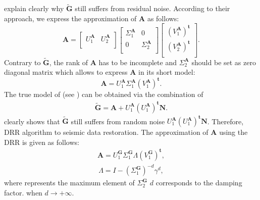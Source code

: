 \citet{huang2016damped} explain clearly why $\mathbf{\tilde{G}}$ still suffers from residual noise. According to their approach, we express the approximation of {$\mathbf{A}$} as follows:
\begin{equation}
\mathbf{A}=\begin{bmatrix}
U^\mathbf{A}_1 & U^\mathbf{A}_2\\
\end{bmatrix}
\begin{bmatrix}
\Sigma^\mathbf{A}_1 & 0\\
0 & \Sigma^\mathbf{A}_2\\
\end{bmatrix}
\begin{bmatrix}
(V^\mathbf{A}_1)^{\mathbf{t}}\\
(V^\mathbf{A}_2)^{\mathbf{t}}\\
\end{bmatrix}.
\end{equation}
Contrary to {$\mathbf{\tilde{G}}$}, the rank of $\mathbf{A}$ has to be incomplete and {$\Sigma^\mathbf{A}_2$} should be set as zero diagonal matrix\new{,} which allows to express $ \mathbf{A} $ in its short model:
\begin{equation}
\mathbf{A}=U^{\mathbf{A}}_1{\Sigma^{\mathbf{A}}_1}(V^{\mathbf{A}}_1)^{\mathbf{t}}.
\end{equation}
The true model of   (see ) can be obtained via the combination of    
\begin{align}
\mathbf{\tilde{G}}= \mathbf{A}+ U^{\mathbf{A}}_1(U^{\mathbf{A}}_1)^{\mathbf{t}}\mathbf{N}.
\end{align}
 clearly shows that {$\mathbf{\tilde{G}}$} still suffers from random noise ${U^\mathbf{A}_1(U^\mathbf{A}_1)^{\mathbf{t}}\mathbf{N}}$. Therefore, \citet{chen2016simultaneous}   DRR algorithm \citep{huang2016damped} to  seismic data restoration. The approximation of {$\mathbf{A}$} using the DRR  is given as follows:
\begin{align}
\mathbf{A}=U^{\mathbf{G}}_1{\Sigma^{\mathbf{G}}_1}\Lambda\left( V^{\mathbf{G}}_1\right)^{\mathbf{t}},
\end{align}
\begin{align}
\Lambda= I - (\Sigma^{\mathbf{G}}_1 )^{-d}{{\gamma}^d},
\end{align} 
where \wen{${\gamma}$} represents the maximum element of {$\Sigma^{\mathbf{G}}_2$} $d$ corresponds to the damping factor.  when {$d\rightarrow+\infty$}. 

